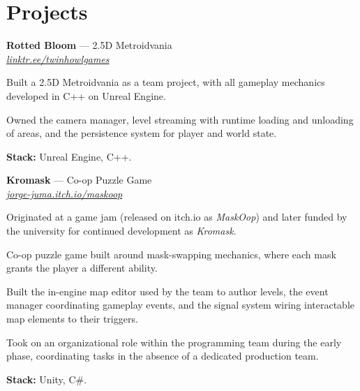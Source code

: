 \section{Projects}

\begin{onecolentry}
\textbf{Rotted Bloom} — 2.5D Metroidvania \\
\textit{\href{https://linktr.ee/twinhowlgames}{linktr.ee/twinhowlgames}}
\end{onecolentry}

\vspace{0.20 cm}
\begin{onecolentry}
\begin{highlights}
\item Built a 2.5D Metroidvania as a team project, with all gameplay mechanics developed in C++ on Unreal Engine.
\item Owned the camera manager, level streaming with runtime loading and unloading of areas, and the persistence system for player and world state.
\item \textbf{Stack:} Unreal Engine, C++.
\end{highlights}
\end{onecolentry}

\vspace{0.2 cm}

\begin{onecolentry}
\textbf{Kromask} — Co-op Puzzle Game \\
\textit{\href{https://jorge-juma.itch.io/maskoop}{jorge-juma.itch.io/maskoop}}
\end{onecolentry}

\vspace{0.20 cm}
\begin{onecolentry}
\begin{highlights}
\item Originated at a game jam (released on itch.io as \textit{MaskOop}) and later funded by the university for continued development as \textit{Kromask}.
\item Co-op puzzle game built around mask-swapping mechanics, where each mask grants the player a different ability.
\item Built the in-engine map editor used by the team to author levels, the event manager coordinating gameplay events, and the signal system wiring interactable map elements to their triggers.
\item Took on an organizational role within the programming team during the early phase, coordinating tasks in the absence of a dedicated production team.
\item \textbf{Stack:} Unity, C\#.
\end{highlights}
\end{onecolentry}

